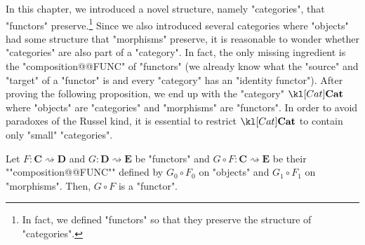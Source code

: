 \documentclass[main.tex]{subfiles}
\begin{document}
In this chapter, we introduced a novel structure, namely "categories", that "functors" preserve.\footnote{In fact, we defined "functors" so that they preserve the structure of "categories".} Since we also introduced several categories where "objects" had some structure that "morphisms" preserve, it is reasonable to wonder whether "categories" are also part of a "category". In fact, the only missing ingredient is the "composition@@FUNC" of "functors" (we already know what the "source" and "target" of a "functor" is and every "category" has an "identity functor"). After proving the following proposition, we end up with the "category" $\catCat$ where "objects" are "categories" and "morphisms" are "functors". In order to avoid paradoxes of the Russel kind, it is essential to restrict $\catCat$ to contain only "small" "categories".
\begin{prop}
	\AP Let $F:\mathbf{C}\rightsquigarrow \mathbf{D}$ and $G: \mathbf{D}\rightsquigarrow \mathbf{E}$ be "functors" and $G \circ F:\mathbf{C} \rightsquigarrow \mathbf{E}$ be their ""composition@@FUNC"" defined by $G_0 \circ F_0$ on "objects" and $G_1 \circ F_1$ on "morphisms". Then, $G \circ F$ is a "functor".
\end{prop}
\end{document}
